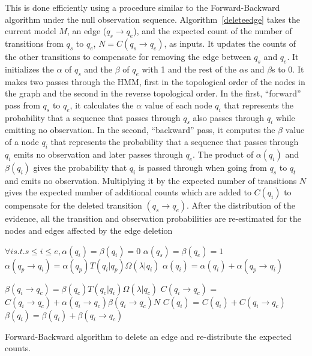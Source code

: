 \documentclass[letterpaper]{article}
\begin{document}
This is done efficiently using a procedure similar to the
Forward-Backward algorithm under the null observation sequence.
Algorithm~\ref{deleteedge} takes the current model $M$, an edge
($q_s \rightarrow q_e$), and the expected count of the number of transitions
from $q_s$ to $q_e$, $N = C(q_s \rightarrow q_e)$,
as inputs. It updates the counts of
the other transitions to compensate for removing the edge between
$q_s$ and $q_e$. It initializes the $\alpha$ of $q_s$ and the $\beta$
of $q_e$ with 1 and the rest of the $\alpha$s and $\beta$s to $0$.
It makes two passes through the HMM,
first in the topological order of the nodes in the graph and the second
in the reverse topological order. In the first, ``forward'' pass
from $q_s$ to $q_e$,
it calculates  the $\alpha$ value of each node $q_i$
that represents the probability that a sequence that
passes through $q_s$ also passes through $q_i$
while emitting no observation. In the second, ``backward'' pass,
it computes the $\beta$ value of a node $q_i$
that represents the probability that a sequence that passes
through
$q_i$ emits no observation and later
passes through $q_e$. The product of
$\alpha(q_i)$ and $\beta(q_i)$ gives the probability that
$q_i$ is passed through when going from $q_s$ to $q_t$ and emits
no observation. Multiplying it by the
expected number of transitions $N$ gives the
expected number of additional counts %
which are added to $C(q_i)$
to compensate for the deleted transition $(q_s \rightarrow q_e)$.
After the distribution of the evidence,
all the transition and observation probabilities are re-estimated for
the nodes and edges affected by the edge deletion

\begin{algorithm}
\footnotesize
\begin{algorithmic}


\State $\forall i s.t. s \leq i \leq e, \alpha(q_i) = \beta(q_i) = 0$
\State $\alpha(q_s) = \beta(q_e) = 1$
\State  $\alpha(q_p \rightarrow q_i) = \alpha(q_p) T(q_i|q_p) \Omega(\lambda|q_i)$
\State $\alpha(q_i) = \alpha(q_i) + \alpha(q_p \rightarrow q_i)$
\EndFor
\EndFor

\State  $\beta(q_i \rightarrow q_c) = \beta(q_c) T(q_c|q_i) \Omega(\lambda|q_c)$
\State  $C(q_i \rightarrow q_c)$ = $C(q_i \rightarrow q_c) + \alpha(q_i \rightarrow q_c)  \beta(q_i \rightarrow q_c) N$
\State  $C(q_i)$ = $C(q_i) + C(q_i \rightarrow q_c)$
\State $\beta(q_i) = \beta(q_i) + \beta(q_i \rightarrow q_c)$
\EndFor
\EndFor
\EndProcedure

\end{algorithmic}
\label{deleteedge}
\caption{Forward-Backward algorithm to delete an edge and re-distribute the expected counts.}
\end{algorithm}
\end{document}
